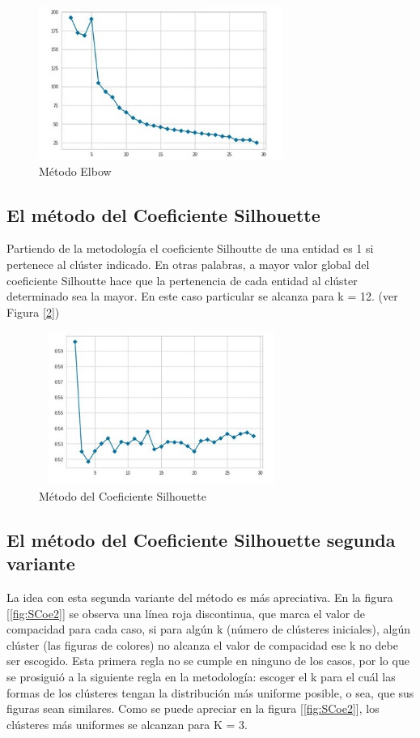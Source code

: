 \begin{figure}[h!]
	\centering
	\includegraphics[width=8cm, height=5cm]{Images/Elbow.jpg} 
	\caption{Método Elbow }
	\label{fig:Elbow}
\end{figure}

\subsection{El método del Coeficiente Silhouette}
Partiendo de la metodología el coeficiente Silhoutte de una entidad es 1 si pertenece al clúster indicado. En otras palabras, a mayor valor global del coeficiente Silhoutte hace que la pertenencia de cada entidad al clúster determinado sea la mayor. En este caso particular se alcanza para k = 12. (ver Figura [\ref*{fig:SCoe1}])

\begin{figure}[h!]
	\centering
	\includegraphics[width=8cm, height=5cm]{Images/SCoe1.jpg} 
	\caption{Método del Coeficiente Silhouette}
	\label{fig:SCoe1}
\end{figure}

\subsection{El método del Coeficiente Silhouette segunda variante}
La idea con esta segunda variante del método es más apreciativa. En la figura [\ref{fig:SCoe2}] se observa una línea roja discontinua, que marca el valor de compacidad para cada caso, si para algún k (número de clústeres iniciales), algún clúster (las figuras de colores) no alcanza el valor de compacidad ese k no debe ser escogido. Esta primera regla no se cumple en ninguno de los casos, por lo que se prosiguió a la siguiente regla en la metodología: escoger el k para el cuál las formas de los clústeres tengan la distribución más uniforme posible, o sea, que sus figuras sean similares. Como se puede apreciar en la figura [\ref{fig:SCoe2}], los clústeres más uniformes se alcanzan para K = 3.


